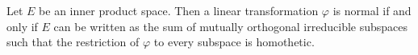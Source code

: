 Let $E$ be an inner product space. Then a linear transformation $\varphi$ is normal if and only if $E$ can be written as the sum of mutually orthogonal irreducible subspaces such that the restriction of $\varphi$ to every subspace is homothetic.
